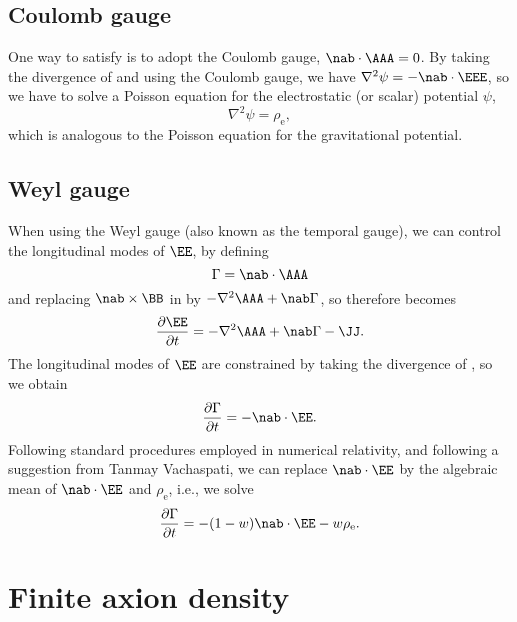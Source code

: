 \documentclass{article}
\begin{document}
\subsection{Coulomb gauge}

One way to satisfy  is to adopt the Coulomb
gauge, $\nab\cdot\AAA=0$.
By taking the divergence of  and using the Coulomb gauge, we have
$\nabla^2\psi=-\nab\cdot\EEE$, so we have to solve a Poisson equation
for the electrostatic (or scalar) potential $\psi$,
\begin{equation}
\nabla^2\psi=\rho_\mathrm{e},
\end{equation}
which is analogous to the Poisson equation for the gravitational potential.

\subsection{Weyl gauge}

When using the Weyl gauge (also known as the temporal gauge),
we can control the longitudinal modes of $\EE$, by defining
\begin{equation}
\Gamma=\nab\cdot\AAA
\end{equation}
and replacing $\nab\times\BB$ in  by $-\nabla^2\AAA+\nab\Gamma$,
so therefore  becomes
\begin{equation}
\frac{\partial\EE}{\partial t}=-\nabla^2\AAA+\nab \Gamma-\JJ.
\label{dE2dt}
\end{equation}
The longitudinal modes of $\EE$ are constrained by
taking the divergence of , so we obtain
\begin{equation}
\frac{\partial\Gamma}{\partial t}=-\nab\cdot\EE.
\label{dGdt}
\end{equation}
Following standard procedures employed in numerical relativity,
and following a suggestion from Tanmay Vachaspati, we can
replace $\nab\cdot\EE$ by the algebraic mean of $\nab\cdot\EE$ and
$\rho_\mathrm{e}$, i.e., we solve
\begin{equation}
\frac{\partial\Gamma}{\partial t}=-(1-w)\nab\cdot\EE
-w\rho_\mathrm{e}.
\label{dG2dt}
\end{equation}

\section{Finite axion density}
\end{document}
